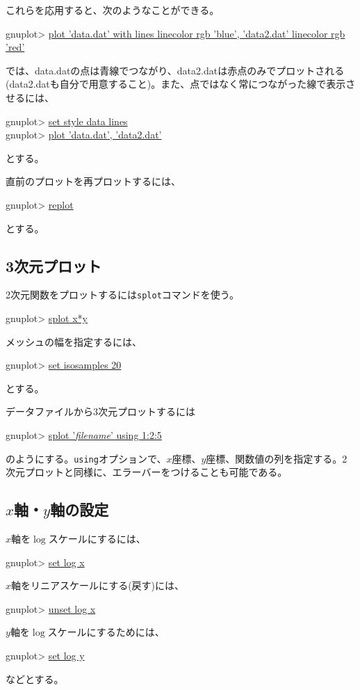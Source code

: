 これらを応用すると、次のようなことができる。
\begin{commandline2}
    gnuplot> \underline{plot 'data.dat' with lines linecolor rgb 'blue', 'data2.dat' linecolor rgb 'red'}
\end{commandline2} \noindent
では、data.datの点は青線でつながり、data2.datは赤点のみでプロットされる(data2.datも自分で用意すること)。また、点ではなく常につながった線で表示させるには、
\begin{commandline2}
    gnuplot> \underline{set style data lines}\\
    gnuplot> \underline{plot 'data.dat', 'data2.dat'}
\end{commandline2} \noindent
とする。

直前のプロットを再プロットするには、
\begin{commandline2}
    gnuplot> \underline{replot}
\end{commandline2} \noindent
とする。

\subsection{3次元プロット}

2次元関数をプロットするには\texttt{splot}コマンドを使う。
\begin{commandline2}
    gnuplot> \underline{splot x*y}
\end{commandline2} \noindent
メッシュの幅を指定するには、
\begin{commandline2}
    gnuplot> \underline{set isosamples 20}
\end{commandline2} \noindent
とする。

データファイルから3次元プロットするには
\begin{commandline2}
    gnuplot> \underline{splot '\textit{filename}' using 1:2:5}
\end{commandline2} \noindent
のようにする。\texttt{using}オプションで、\(x\)座標、\(y\)座標、関数値の列を指定する。2次元プロットと同様に、エラーバーをつけることも可能である。

\subsection{\texorpdfstring{\(x\)軸・\(y\)軸の設定}{x,y軸の設定}}

\(x\)軸を\(\log\)スケールにするには、
\begin{commandline2}
    gnuplot> \underline{set log x}
\end{commandline2} \noindent
\(x\)軸をリニアスケールにする(戻す)には、
\begin{commandline2}
    gnuplot> \underline{unset log x}
\end{commandline2} \noindent
\(y\)軸を\(\log\)スケールにするためには、
\begin{commandline2}
    gnuplot> \underline{set log y}
\end{commandline2} \noindent
などとする。

